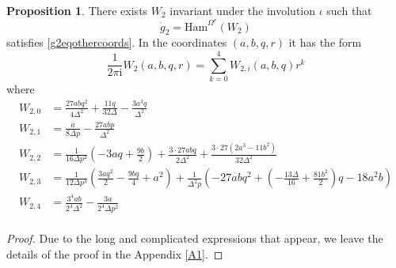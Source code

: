 \documentclass{article}
\theoremstyle{definition}
\newtheorem{proposition}[theorem]{Proposition}
\numberwithin{equation}{section}
\begin{document}
\begin{proposition}\label{w2prop}
    There exists $W_2$ invariant under the involution $\iota$ such that
    \begin{equation*}
        \dot{g}_2=\text{Ham}^{\Omega^{v}}(W_2)
    \end{equation*}
    satisfies \eqref{g2eqothercoords}. In the coordinates $(a,b,q,r)$ it has the form
    \begin{equation}\label{w2ansatz}
        \frac{1}{2\pi \mathrm{i}}W_2(a,b,q,r)=\sum_{k=0}^{4}W_{2,i}(a,b,q)r^k
    \end{equation}
    where 
    \begin{equation}\label{w2compexplicit}
        \begin{split}
        W_{2,0}&=\frac{27abq^2}{4\Delta^2}+\frac{11q}{32\Delta}-\frac{3a^3q}{\Delta^2}\\
        W_{2,1}&=\frac{a}{8\Delta p}-\frac{27ab p}{\Delta^2}\\
        W_{2,2}&=\frac{1}{16\Delta p^2}\left(-3aq+\frac{9b}{2}\right)+\frac{3\cdot 27abq}{2\Delta^2}+\frac{3\cdot 27(2a^3-11b^2)}{32\Delta^2}\\
        W_{2,3}&=\frac{1}{12\Delta p^3}\left(\frac{3aq^2}{2}-\frac{9bq}{4}+a^2\right)+\frac{1}{\Delta^2p}\left(-27abq^2+\left(-\frac{13\Delta}{16}+\frac{81b^2}{2}\right)q-18a^2b\right)\\
        W_{2,4}&=\frac{3^4ab}{2^4\Delta^2}-\frac{3a}{2^4\Delta p^2}\\
    \end{split}
    \end{equation}
\end{proposition}
\begin{proof}
Due to the long and complicated expressions that appear, we leave the details of the proof in the Appendix \ref{A1}.
\end{proof}
\end{document}
